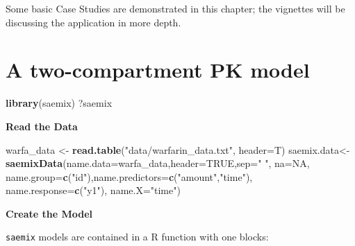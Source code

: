 \documentclass[]{book}
\newenvironment{Shaded}{\begin{snugshade}}{\end{snugshade}}
\newcommand{\KeywordTok}[1]{\textcolor[rgb]{0.13,0.29,0.53}{\textbf{{#1}}}}
\newcommand{\DataTypeTok}[1]{\textcolor[rgb]{0.13,0.29,0.53}{{#1}}}
\newcommand{\StringTok}[1]{\textcolor[rgb]{0.31,0.60,0.02}{{#1}}}
\newcommand{\OtherTok}[1]{\textcolor[rgb]{0.56,0.35,0.01}{{#1}}}
\newcommand{\NormalTok}[1]{{#1}}
\begin{document}
Some basic Case Studies are demonstrated in this chapter; the vignettes
will be discussing the application in more depth.

\section{A two-compartment PK model}\label{a-two-compartment-pk-model}

\begin{Shaded}
\begin{Highlighting}[]
\KeywordTok{library}\NormalTok{(saemix)}
\NormalTok{?saemix}
\end{Highlighting}
\end{Shaded}

\textbf{Read the Data}

\begin{Shaded}
\begin{Highlighting}[]
\NormalTok{warfa_data <-}\StringTok{ }\KeywordTok{read.table}\NormalTok{(}\StringTok{"data/warfarin_data.txt"}\NormalTok{, }\DataTypeTok{header=}\NormalTok{T)}
\NormalTok{saemix.data<-}\KeywordTok{saemixData}\NormalTok{(}\DataTypeTok{name.data=}\NormalTok{warfa_data,}\DataTypeTok{header=}\OtherTok{TRUE}\NormalTok{,}\DataTypeTok{sep=}\StringTok{" "}\NormalTok{,}
  \DataTypeTok{na=}\OtherTok{NA}\NormalTok{, }\DataTypeTok{name.group=}\KeywordTok{c}\NormalTok{(}\StringTok{"id"}\NormalTok{),}\DataTypeTok{name.predictors=}\KeywordTok{c}\NormalTok{(}\StringTok{"amount"}\NormalTok{,}\StringTok{"time"}\NormalTok{),}
  \DataTypeTok{name.response=}\KeywordTok{c}\NormalTok{(}\StringTok{"y1"}\NormalTok{), }\DataTypeTok{name.X=}\StringTok{"time"}\NormalTok{)}
\end{Highlighting}
\end{Shaded}

\textbf{Create the Model}

\texttt{saemix} models are contained in a R function with one blocks:
\end{document}
